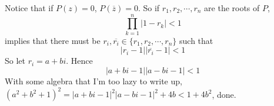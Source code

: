 Notice that if $P(z)=0$, $P(\overbar{z})=0$. So if $r_1, r_2, \cdots, r_n$ are the roots of $P$,
$$\prod_{k=1}^n |1-r_k|<1$$
implies that there must be $r_i, \overbar{r_i}\in \{r_1, r_2, \cdots, r_n\}$ such that
$$|r_i-1||\overbar{r_i}-1|<1$$
So let $r_i=a+bi$. Hence
$$|a+bi-1||a-bi-1|<1$$
With some algebra that I'm too lazy to write up, $(a^2+b^2+1)^2=|a+bi-1|^2|a-bi-1|^2+4b<1+4b^2$, done.
